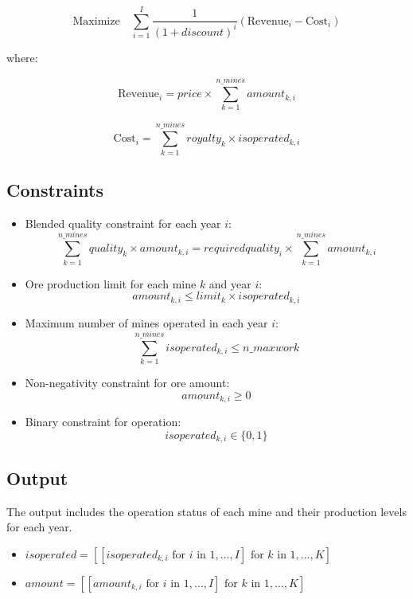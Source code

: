 \documentclass{article}
\begin{document}
\[
\text{Maximize} \quad \sum_{i=1}^{I} \frac{1}{(1 + discount)^i} \left( \text{Revenue}_i - \text{Cost}_i \right)
\]

where:

\[
\text{Revenue}_i = price \times \sum_{k=1}^{n\_mines} amount_{k,i}
\]

\[
\text{Cost}_i = \sum_{k=1}^{n\_mines} royalty_k \times isoperated_{k,i}
\]

\subsection*{Constraints}
\begin{itemize}
    \item Blended quality constraint for each year $i$:
    \[
    \sum_{k=1}^{n\_mines} quality_k \times amount_{k,i} = requiredquality_i \times \sum_{k=1}^{n\_mines} amount_{k,i}
    \]

    \item Ore production limit for each mine $k$ and year $i$:
    \[
    amount_{k,i} \leq limit_k \times isoperated_{k,i}
    \]

    \item Maximum number of mines operated in each year $i$:
    \[
    \sum_{k=1}^{n\_mines} isoperated_{k,i} \leq n\_maxwork
    \]

    \item Non-negativity constraint for ore amount:
    \[
    amount_{k,i} \geq 0
    \]

    \item Binary constraint for operation:
    \[
    isoperated_{k,i} \in \{0, 1\}
    \]
\end{itemize}

\subsection*{Output}
The output includes the operation status of each mine and their production levels for each year.

\begin{itemize}
    \item $isoperated = [[isoperated_{k,i} \text{ for } i \text{ in } 1,\ldots,I] \text{ for } k \text{ in } 1,\ldots,K]$
    \item $amount = [[amount_{k,i} \text{ for } i \text{ in } 1,\ldots,I] \text{ for } k \text{ in } 1,\ldots,K]$
\end{itemize}
\end{document}
